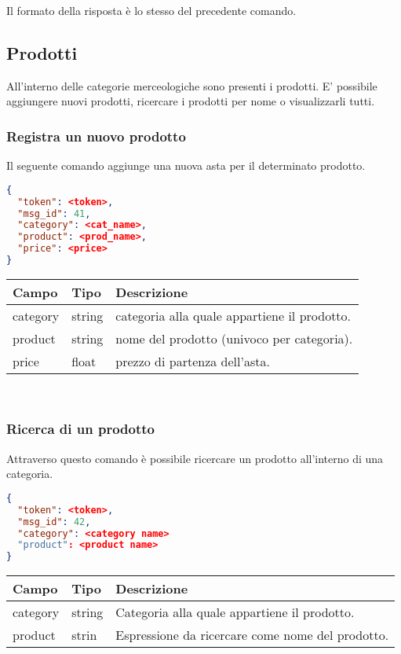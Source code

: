 Il formato della risposta è lo stesso del precedente comando.
\subsection{Prodotti}
All'interno delle categorie merceologiche sono presenti i prodotti. E' possibile aggiungere nuovi prodotti, ricercare i prodotti per nome o visualizzarli tutti.
\subsubsection{Registra un nuovo prodotto}
Il seguente comando aggiunge una nuova asta per il determinato prodotto.
\begin{lstlisting}[language=json]
{
  "token": <token>,
  "msg_id": 41,
  "category": <cat_name>,
  "product": <prod_name>,
  "price": <price>
}
\end{lstlisting}

\begin{tabular}{|l | l | l |}
\hline
Campo & Tipo & Descrizione \\ \hline
category & string & categoria alla quale appartiene il prodotto. \\ \hline
product & string & nome del prodotto (univoco per categoria).\\ \hline
price & float & prezzo di partenza dell'asta.\\ \hline
\end{tabular} \\

\subsubsection{Ricerca di un prodotto} \label{sssec:rp}
Attraverso questo comando è possibile ricercare un prodotto all'interno di una categoria.
\begin{lstlisting}[language=json]
{
  "token": <token>,
  "msg_id": 42,
  "category": <category name>
  "product": <product name>
}
\end{lstlisting}

\begin{tabular}{|l | l | l |}
\hline
Campo & Tipo & Descrizione \\ \hline
category & string & Categoria alla quale appartiene il prodotto. \\ \hline
product & strin & Espressione da ricercare come nome del prodotto.\\ \hline
\end{tabular} \\
